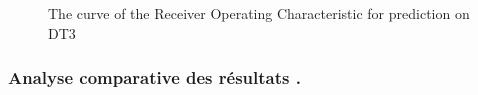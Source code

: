 \begin{figure}[!h]
\centering
{}%
\caption{The curve of the Receiver Operating Characteristic for prediction on DT3}\label{curve_roc_dt3}
\end{figure}
\subsubsection{Analyse comparative des résultats .}




